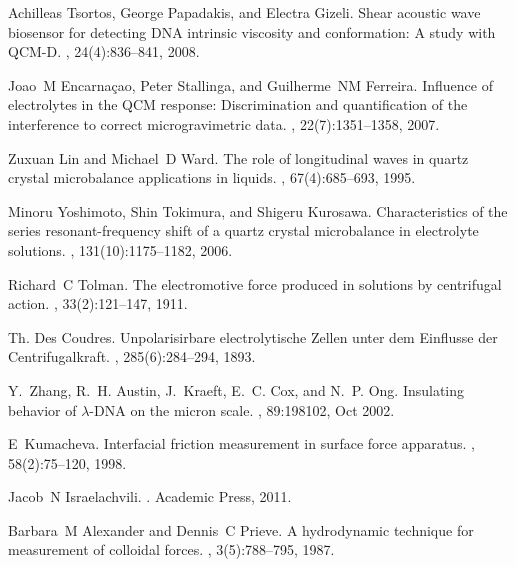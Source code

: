 \documentclass[floatfix,superscriptaddress,a4paper,twocolumn]{revtex4-1}
\begin{document}
\begin{thebibliography}{10}
Achilleas Tsortos, George Papadakis, and Electra Gizeli.
\newblock Shear acoustic wave biosensor for detecting {DNA} intrinsic viscosity
  and conformation: A study with {QCM-D}.
, 24(4):836--841, 2008.

Joao~M Encarna\c{c}ao, Peter Stallinga, and Guilherme~NM Ferreira.
\newblock Influence of electrolytes in the {QCM} response: Discrimination and
  quantification of the interference to correct microgravimetric data.
, 22(7):1351--1358, 2007.

Zuxuan Lin and Michael~D Ward.
\newblock The role of longitudinal waves in quartz crystal microbalance
  applications in liquids.
, 67(4):685--693, 1995.

Minoru Yoshimoto, Shin Tokimura, and Shigeru Kurosawa.
\newblock Characteristics of the series resonant-frequency shift of a quartz
  crystal microbalance in electrolyte solutions.
, 131(10):1175--1182, 2006.

Richard~C Tolman.
\newblock The electromotive force produced in solutions by centrifugal action.
, 33(2):121--147, 1911.

Th. {Des Coudres}.
\newblock Unpolarisirbare electrolytische {Z}ellen unter dem {E}influsse der
  {C}entrifugalkraft.
, 285(6):284--294, 1893.

Y.~Zhang, R.~H. Austin, J.~Kraeft, E.~C. Cox, and N.~P. Ong.
\newblock Insulating behavior of $\lambda$-{DNA} on the micron scale.
, 89:198102, Oct 2002.

E~Kumacheva.
\newblock Interfacial friction measurement in surface force apparatus.
, 58(2):75--120, 1998.

Jacob~N Israelachvili.
.
\newblock Academic Press, 2011.

Barbara~M Alexander and Dennis~C Prieve.
\newblock A hydrodynamic technique for measurement of colloidal forces.
, 3(5):788--795, 1987.


\end{thebibliography}
\end{document}
